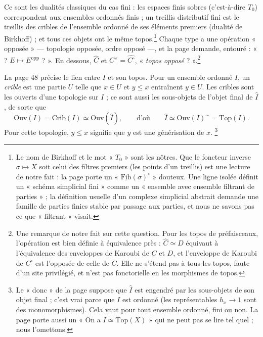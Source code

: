 \documentclass[11pt,a4paper]{article}
\begin{document}
Ce sont les dualités classiques du cas fini : les espaces finis sobres
(c'est-à-dire $T_0$) correspondent aux ensembles ordonnés finis ; un treillis
distributif fini est le treillis des cribles de l'ensemble ordonné de ses
éléments premiers (dualité de Birkhoff) ; et tous ces objets ont le même
topos.\footnote{Le nom de Birkhoff et le mot « $T_0$ » sont les nôtres. Que
le foncteur inverse $\sigma \mapsto X$ soit celui des filtres premiers (les
points d'un treillis) est une lecture de notre fait : la page porte un
« $\underline{\mathrm{Fib}}(\sigma)^{\circ}$ » douteux. Une ligne isolée
définit un « schéma simplicial fini » comme un « ensemble avec ensemble
filtrant de parties » ; la définition usuelle d'un complexe simplicial
abstrait demande une famille de parties finies stable par passage aux
parties, et nous ne savons pas ce que « filtrant » visait.}
Chaque type a une opération « opposée » --- topologie opposée, ordre opposé ---,
et la page demande, entouré : « ? $E \mapsto E^{\mathrm{opp}}$ ? ». En
dessous, $\widehat{C}$ et $C^{\vee} = \widehat{C^{\circ}}$, « \emph{topos
opposé} ? ».\footnote{Une remarque de notre fait sur cette question. Pour les
topos de préfaisceaux, l'opération est bien définie à équivalence près :
$\widehat{C} \simeq \widehat{D}$ équivaut à l'équivalence des enveloppes de
Karoubi de $C$ et $D$, et l'enveloppe de Karoubi de $C^{\circ}$ est l'opposée
de celle de $C$. Elle ne s'étend pas à tous les topos, faute d'un site
privilégié, et n'est pas fonctorielle en les morphismes de topos.}

La page 48 précise le lien entre $I$ et son topos. Pour un ensemble ordonné
$I$, un \emph{crible} est une partie $U$ telle que $x \in U$ et $y \le x$
entraînent $y \in U$. Les cribles sont les ouverts d'une topologie sur $I$ ;
ce sont aussi les sous-objets de l'objet final de $\widehat{I}$, de sorte que
\[
\mathrm{Ouv}(I) = \mathrm{Crib}(I) \simeq \mathrm{Ouv}(\widehat{I}) ,
\qquad\text{d'où}\qquad
\widehat{I} \simeq \mathrm{Ouv}(I)^{\sim} = \mathrm{Top}(I) .
\]
Pour cette topologie, $y \le x$ signifie que $y$ est une générisation de $x$.
\footnote{Le « donc » de la page suppose que $\widehat{I}$ est engendré par
les sous-objets de son objet final ; c'est vrai parce que $I$ est ordonné (les
représentables $h_x \to 1$ sont des monomorphismes). Cela vaut pour tout
ensemble ordonné, fini ou non. La page porte aussi un « On a $I \simeq
\mathrm{Top}(X)$ » qui ne peut pas se lire tel quel ; nous l'omettons.}
\end{document}
